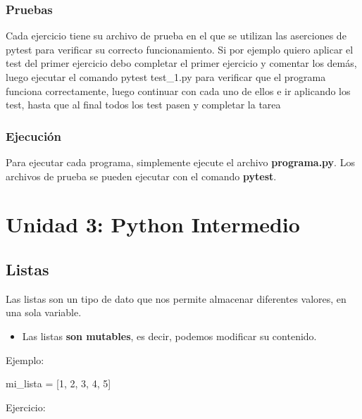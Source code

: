 \documentclass[
  a4paper,
  DIV=11,
  numbers=noendperiod,
  onepage,
  openany]{scrreprt}
\newenvironment{Shaded}{\begin{snugshade}}{\end{snugshade}}
\newcommand{\DecValTok}[1]{\textcolor[rgb]{0.68,0.00,0.00}{#1}}
\newcommand{\NormalTok}[1]{\textcolor[rgb]{0.00,0.23,0.31}{#1}}
\newcommand{\OperatorTok}[1]{\textcolor[rgb]{0.37,0.37,0.37}{#1}}
\providecommand{\tightlist}{%
  \setlength{\itemsep}{0pt}\setlength{\parskip}{0pt}}\usepackage{longtable,booktabs,array}
\begin{document}
\section{Pruebas}\label{pruebas}

Cada ejercicio tiene su archivo de prueba en el que se utilizan las
aserciones de pytest para verificar su correcto funcionamiento. Si por
ejemplo quiero aplicar el test del primer ejercicio debo completar el
primer ejercicio y comentar los demás, luego ejecutar el comando pytest
test\_1.py para verificar que el programa funciona correctamente, luego
continuar con cada uno de ellos e ir aplicando los test, hasta que al
final todos los test pasen y completar la tarea

\section{Ejecución}\label{ejecuciuxf3n}

Para ejecutar cada programa, simplemente ejecute el archivo
\textbf{programa.py}. Los archivos de prueba se pueden ejecutar con el
comando \textbf{pytest}.

\part{Unidad 3: Python Intermedio}

\chapter{Listas}\label{listas}

Las listas son un tipo de dato que nos permite almacenar diferentes
valores, en una sola variable.

\begin{itemize}
\tightlist
\item
  Las listas \textbf{son mutables}, es decir, podemos modificar su
  contenido.
\end{itemize}

Ejemplo:

\begin{Shaded}
\begin{Highlighting}[]
\NormalTok{mi\_lista }\OperatorTok{=}\NormalTok{ [}\DecValTok{1}\NormalTok{, }\DecValTok{2}\NormalTok{, }\DecValTok{3}\NormalTok{, }\DecValTok{4}\NormalTok{, }\DecValTok{5}\NormalTok{]}
\end{Highlighting}
\end{Shaded}

Ejercicio:
\end{document}
